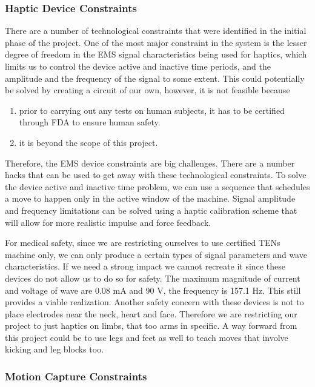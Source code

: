 \subsubsection{Haptic Device Constraints}

There are a number of technological constraints that were identified in the initial phase of the project. One of the most major constraint in the system is the lesser degree of freedom in the EMS signal characteristics being used for haptics, which limits us to control the device active and inactive time periods, and the amplitude and the frequency of the signal to some extent. This could potentially be solved by creating a circuit of our own, however, it is not feasible because 

\begin{enumerate}
  \item prior to carrying out any tests on human subjects, it has to be certified through FDA to ensure human safety. 
  \item it is beyond the scope of this project.
\end{enumerate}

Therefore, the EMS device constraints are big challenges. There are a number hacks that can be used to get away with these technological constraints. To solve the device active and inactive time problem, we can use a sequence that schedules a move to happen only in the active window of the machine. Signal amplitude and frequency limitations can be solved using a haptic calibration scheme that will allow for more realistic impulse and force feedback. 


For medical safety, since we are restricting ourselves to use certified TENs machine only, we can only produce a certain types of signal parameters and wave characteristics. If we need a strong impact we cannot recreate it since these devices do not allow us to do so for safety. The maximum magnitude of current and voltage of wave are 0.08 mA and 90 V, the frequency is 157.1 Hz. This still provides a viable realization. Another safety concern with these devices is not to place electrodes near the neck, heart and face. Therefore we are restricting our project to just haptics on limbs, that too arms in specific. A way forward from this project could be to use legs and feet as well to teach moves that involve kicking and leg blocks too.


\subsubsection{Motion Capture Constraints}

